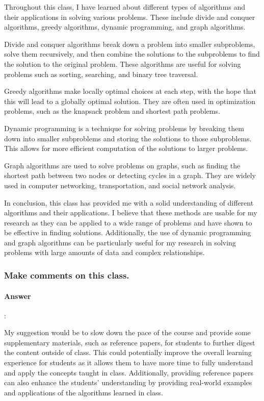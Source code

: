 \documentclass{article}
\begin{document}
Throughout this class, I have learned about different types of algorithms and their applications in solving various problems. These include divide and conquer algorithms, greedy algorithms, dynamic programming, and graph algorithms.

Divide and conquer algorithms break down a problem into smaller subproblems, solve them recursively, and then combine the solutions to the subproblems to find the solution to the original problem. These algorithms are useful for solving problems such as sorting, searching, and binary tree traversal.

Greedy algorithms make locally optimal choices at each step, with the hope that this will lead to a globally optimal solution. They are often used in optimization problems, such as the knapsack problem and shortest path problems.

Dynamic programming is a technique for solving problems by breaking them down into smaller subproblems and storing the solutions to those subproblems. This allows for more efficient computation of the solutions to larger problems.

Graph algorithms are used to solve problems on graphs, such as finding the shortest path between two nodes or detecting cycles in a graph. They are widely used in computer networking, transportation, and social network analysis.

In conclusion, this class has provided me with a solid understanding of different algorithms and their applications. I believe that these methods are usable for my research as they can be applied to a wide range of problems and have shown to be effective in finding solutions. Additionally, the use of dynamic programming and graph algorithms can be particularly useful for my research in solving problems with large amounts of data and complex relationships.

\subsubsection{Make comments on this class.}

\paragraph{Answer}:

My suggestion would be to slow down the pace of the course and provide some supplementary materials, such as reference papers, for students to further digest the content outside of class. This could potentially improve the overall learning experience for students as it allows them to have more time to fully understand and apply the concepts taught in class. Additionally, providing reference papers can also enhance the students' understanding by providing real-world examples and applications of the algorithms learned in class.
\end{document}
